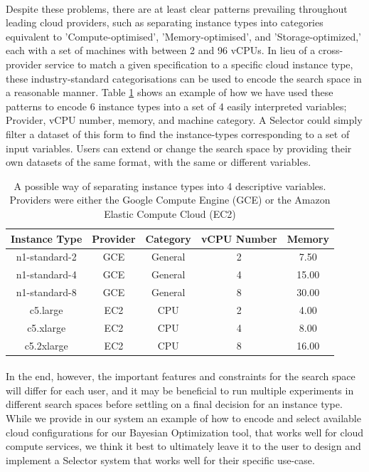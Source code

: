 \documentclass{report}
\begin{document}
\paragraph{}
Despite these problems, there are at least clear patterns prevailing throughout leading cloud providers, such as separating instance types into categories equivalent to 'Compute-optimised', 'Memory-optimised', and 'Storage-optimized,' each with a set of machines with between 2 and 96 vCPUs. In lieu of a cross-provider service to match a given specification to a specific cloud instance type, these industry-standard categorisations can be used to encode the search space in a reasonable manner. Table \ref{tab:config-encode} shows an example of how we have used these patterns to encode 6 instance types into a set of 4 easily interpreted variables; Provider, vCPU number, memory, and machine category. A Selector could simply filter a dataset of this form to find the instance-types corresponding to a set of input variables. Users can extend or change the search space by providing their own datasets of the same format, with the same or different variables.

\begin{table}[!t]
\centering
\begin{tabular}{ |c||c|c|c|c|  }
 \hline
 Instance Type & Provider & Category & vCPU Number & Memory \\
 \hline
 n1-standard-2    & GCE  & General & 2 & 7.50 \\
 n1-standard-4    & GCE  & General & 4 & 15.00 \\
 n1-standard-8    & GCE  & General & 8 & 30.00 \\
 c5.large         & EC2  & CPU & 2 & 4.00 \\
 c5.xlarge    & EC2  & CPU & 4 & 8.00 \\
 c5.2xlarge    & EC2  & CPU & 8 & 16.00 \\
 \hline
\end{tabular}
\caption{A possible way of separating instance types into 4 descriptive variables. Providers were either the Google Compute Engine (GCE) or the Amazon Elastic Compute Cloud (EC2)}
\label{tab:config-encode}
\end{table}

\paragraph{}
In the end,  however, the important features and constraints for the search space will differ for each user, and it may be beneficial to run multiple experiments in different search spaces before settling on a final decision for an instance type. While we provide in our system an example of how to encode and select available cloud configurations for our Bayesian Optimization tool, that works well for cloud compute services, we think it best to ultimately leave it to the user to design and implement a Selector system that works well for their specific use-case.
\end{document}
